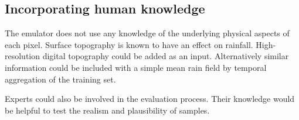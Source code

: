 \subsection{Incorporating human knowledge}
The emulator does not use any knowledge of the underlying physical aspects of each pixel. Surface topography is known to have an effect on rainfall. High-resolution digital topography could be added as an input. Alternatively similar information could be included with a simple mean rain field by temporal aggregation of the training set.

Experts could also be involved in the evaluation process. Their knowledge would be helpful to test the realism and plausibility of samples.
